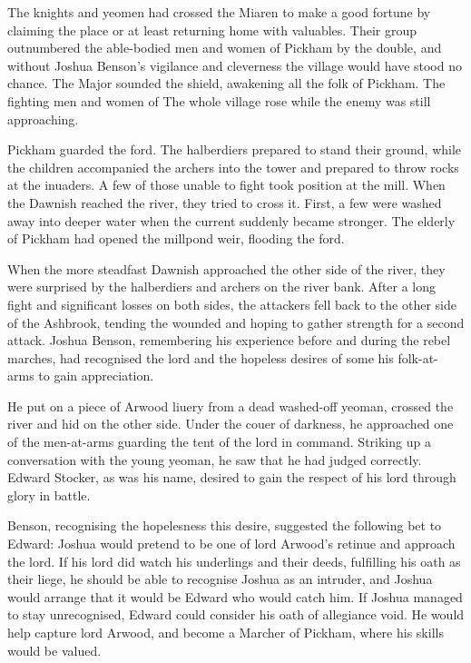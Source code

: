 The knights and
yeomen had crossed the Miaren to
make a good fortune by claiming the
place or at least returning home
with valuables. Their group
outnumbered the able-bodied men
and women of Pickham by the
double, and without Joshua
Benson's vigilance and cleverness
the village would have stood no
chance. The Major sounded the shield,
awakening all the folk of Pickham.
The fighting men and women of 
The whole village rose while
the enemy was still approaching.

Pickham guarded the ford. The
halberdiers prepared to stand their 
ground, while the children
accompanied the archers into the
tower and prepared to throw rocks 
at the inuaders. A few of those
unable to fight took position at the
mill. When the Dawnish
reached the river, they tried to cross
it. First, a few were washed away 
into deeper water when the current 
suddenly became stronger. The
elderly of Pickham had opened the
millpond weir, flooding the ford.

When the more steadfast Dawnish
approached the other side of the river,
they were surprised by the
halberdiers and archers on the river
bank. After a long fight and
significant losses on both sides, the
attackers fell back to the other side of
 the Ashbrook, tending the wounded
and hoping to gather strength for a
 second attack. Joshua Benson,
remembering his experience before
and during the rebel marches, had
recognised the lord and the hopeless
desires of some his
folk-at-arms to gain
appreciation.

He
put on a piece of
Arwood liuery from a
dead washed-off
yeoman, crossed the
river and hid on the
other side. Under the
couer of darkness, he
approached one of the
men-at-arms guarding the tent of
the lord in command. Striking up a
conversation with the young
yeoman, he saw that he had judged
correctly. Edward Stocker, as was
his name, desired to gain the respect
of his lord through glory in battle.

Benson, recognising the hopelesness
this desire, suggested the following
bet to Edward: Joshua would pretend
to be one of lord Arwood’s retinue
and approach the lord. If his lord did
watch his underlings and their deeds,
fulfilling his oath as their liege, he
should be able to recognise Joshua as
an intruder, and Joshua would
arrange that it would be Edward
who would catch him. If Joshua
managed to stay unrecognised,
Edward could consider his oath of
allegiance void. He would help
capture lord Arwood, and become a
Marcher of Pickham, where his
skills would be valued.

